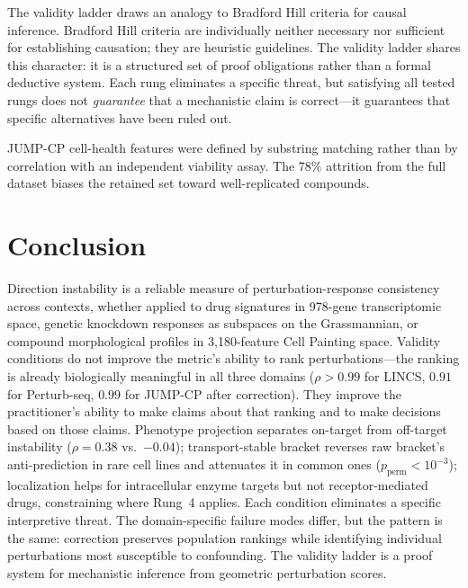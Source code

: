 \documentclass{article}
\begin{document}
The validity ladder draws an analogy to Bradford Hill criteria for causal
inference. Bradford Hill criteria are individually neither necessary nor
sufficient for establishing causation; they are heuristic guidelines. The
validity ladder shares this character: it is a structured set of proof
obligations rather than a formal deductive system. Each rung eliminates
a specific threat, but satisfying all tested rungs does not
\emph{guarantee} that a mechanistic claim is correct---it guarantees
that specific alternatives have been ruled out.

JUMP-CP cell-health features were defined by substring matching rather
than by correlation with an independent viability assay. The 78\% attrition
from the full dataset biases the retained set toward well-replicated
compounds.

\section{Conclusion}

Direction instability is a reliable measure of perturbation-response
consistency across contexts, whether applied to drug signatures in 978-gene
transcriptomic space, genetic knockdown responses as subspaces on the
Grassmannian, or compound morphological profiles in 3{,}180-feature Cell
Painting space. Validity conditions do not improve the metric's ability to
rank perturbations---the ranking is already biologically meaningful in all
three domains ($\rho > 0.99$ for LINCS, $0.91$ for Perturb-seq,
$0.99$ for JUMP-CP after correction). They improve the practitioner's
ability to make claims about that ranking and to make decisions based on
those claims.
Phenotype projection separates on-target from off-target instability
($\rho = 0.38$ vs.\ $-0.04$); transport-stable bracket reverses raw
bracket's anti-prediction in rare cell lines and attenuates it in common
ones ($p_{\text{perm}} < 10^{-3}$); localization helps for intracellular
enzyme targets but not receptor-mediated drugs, constraining where Rung~4
applies. Each condition eliminates a specific interpretive threat.
The domain-specific failure modes differ, but the pattern is the same:
correction preserves population rankings while identifying individual
perturbations most susceptible to confounding. The validity ladder is a
proof system for mechanistic inference from geometric perturbation scores.



\end{document}
